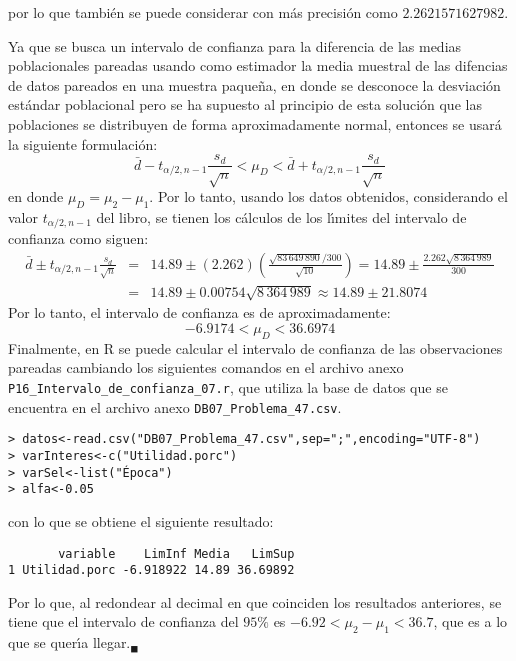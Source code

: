 \begin{solucion}
 \vspace{-0.5cm}
 por lo que tambi\'en se puede considerar con m\'as precisi\'on como $2.2621571627982$.
 \par 
 Ya que se busca un intervalo de confianza para la diferencia de las medias poblacionales pareadas usando como estimador la media muestral de las difencias de datos pareados en una muestra paque\~na, en donde se desconoce la desviaci\'on est\'andar poblacional pero se ha supuesto al principio de esta soluci\'on que las poblaciones se distribuyen de forma aproximadamente normal, entonces se usar\'a la siguiente formulaci\'on: 
 \begin{equation*}
  \bar{d} - t_{\alpha/2,n-1} \frac{s_d}{\sqrt{n}} < \mu_D < \bar{d} + t_{\alpha/2,n-1} \frac{s_d}{\sqrt{n}}
 \end{equation*}
 en donde $\mu_D = \mu_2 - \mu_1$. Por lo tanto, usando los datos obtenidos, considerando el valor $t_{\alpha/2,n-1}$ del libro, se tienen los c\'alculos de los l\'{\i}mites del intervalo de confianza como siguen:
 \begin{eqnarray*}
  \bar{d} \pm t_{\alpha/2,n-1} \frac{s_d}{\sqrt{n}} & = & 14.89 \pm (2.262) \left( \frac{\sqrt{83\,649\,890}/300}{\sqrt{10}} \right) = 14.89 \pm \frac{2.262\sqrt{8\,364\,989}}{300} \\
  & = & 14.89 \pm 0.00754\sqrt{8\,364\,989} \approx 14.89 \pm 21.8074
 \end{eqnarray*}
 Por lo tanto, el intervalo de confianza es de aproximadamente:
 \begin{equation*}
  -6.9174 < \mu_D < 36.6974
 \end{equation*}
 Finalmente, en R se puede calcular el intervalo de confianza de las observaciones pareadas cambiando los siguientes comandos en el archivo anexo \texttt{P16\_Intervalo\_de\_confianza\_07.r}, que utiliza la base de datos que se encuentra en el archivo anexo \texttt{DB07\_Problema\_47.csv}.
 \begin{verbatim}
> datos<-read.csv("DB07_Problema_47.csv",sep=";",encoding="UTF-8")
> varInteres<-c("Utilidad.porc")
> varSel<-list("Época")
> alfa<-0.05
 \end{verbatim}
 \vspace{-0.5cm}
 con lo que se obtiene el siguiente resultado:
 \begin{verbatim}
       variable    LimInf Media   LimSup
1 Utilidad.porc -6.918922 14.89 36.69892
 \end{verbatim}
 \vspace{-0.5cm}
 Por lo que, al redondear al decimal en que coinciden los resultados anteriores, se tiene que el intervalo de confianza del $95\%$ es $-6.92 < \mu_2 - \mu_1 < 36.7$, que es a lo que se quer\'{\i}a llegar.${}_{\blacksquare}$
\end{solucion}
